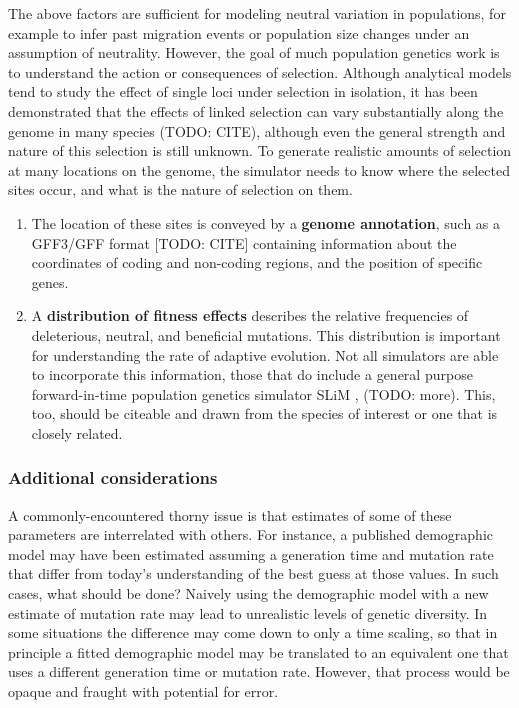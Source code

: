 \documentclass[hidelinks]{article}
\begin{document}
The above factors are sufficient for modeling neutral variation in
populations, for example to infer past migration events or population
size changes under an assumption of neutrality. However, the goal of
much population genetics work is to understand the action or
consequences of selection. Although analytical models tend to study the
effect of single loci under selection in isolation, it has been
demonstrated that the effects of linked selection can vary substantially
along the genome in many species (TODO: CITE), although even the general
strength and nature of this selection is still unknown. To generate
realistic amounts of selection at many locations on the genome, the
simulator needs to know where the selected sites occur, and what is the
nature of selection on them.

\begin{enumerate}
\def\labelenumi{\arabic{enumi}.}
\setcounter{enumi}{5}
\item
  The location of these sites is conveyed by a \textbf{genome
  annotation}, such as a GFF3/GFF format {[}TODO: CITE{]} containing
  information about the coordinates of coding and non-coding regions,
  and the position of specific genes.
\item
  A \textbf{distribution of fitness effects} describes the relative
  frequencies of deleterious, neutral, and beneficial mutations. This
  distribution is important for understanding the rate of adaptive
  evolution. Not all simulators are able to incorporate this
  information, those that do include a general purpose forward-in-time
  population genetics simulator SLiM \citep{Haller2019}, (TODO: more). This,
  too, should be citeable and drawn from the species of interest or one
  that is closely related.
\end{enumerate}

\hypertarget{additional-considerations}{%
\subsubsection*{Additional
considerations}\label{additional-considerations}}

A commonly-encountered thorny issue is that estimates of some of these
parameters are interrelated with others. For instance, a published
demographic model may have been estimated assuming a generation time and
mutation rate that differ from today's understanding of the best guess
at those values. In such cases, what should be done? Naively using the
demographic model with a new estimate of mutation rate may lead to
unrealistic levels of genetic diversity. In some situations the
difference may come down to only a time scaling, so that in principle a
fitted demographic model may be translated to an equivalent one that
uses a different generation time or mutation rate. However, that process
would be opaque and fraught with potential for error.
\end{document}
